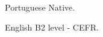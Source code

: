 

\begin{cvskills}

  \cvskill
    {Portuguese} %
    {Native.} %

  \cvskill
    {English} %
    {B2 level - CEFR.} %
    


\end{cvskills}




